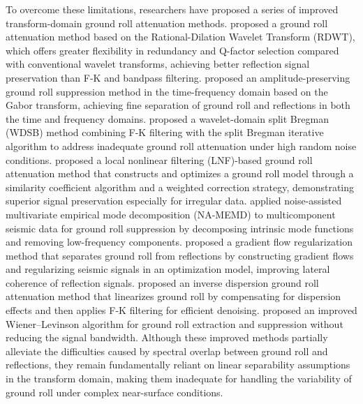 \documentclass[a4paper,fleqn]{cas-dc}
\begin{document}
To overcome these limitations, researchers have proposed a series of improved transform-domain 
ground roll attenuation methods. \citet{mehr2013innovative} proposed a ground roll attenuation 
method based on the Rational-Dilation Wavelet Transform (RDWT), which offers greater 
flexibility in redundancy and Q-factor selection compared with conventional wavelet transforms, 
achieving better reflection signal preservation than F-K and bandpass filtering. 
\citet{wu2024amplitude} proposed an amplitude-preserving ground roll suppression method in 
the time-frequency domain based on the Gabor transform, achieving fine separation of ground 
roll and reflections in both the time and frequency domains. \citet{iranimehr2021seismic} 
proposed a wavelet-domain split Bregman (WDSB) method combining F-K filtering with the split 
Bregman iterative algorithm to address inadequate ground roll attenuation under high random 
noise conditions. \citet{yuan2022adaptive} proposed a local nonlinear filtering (LNF)-based 
ground roll attenuation method that constructs and optimizes a ground roll model through a 
similarity coefficient algorithm and a weighted correction strategy, demonstrating superior 
signal preservation especially for irregular data. \citet{xiao2022ground} applied 
noise-assisted multivariate empirical mode decomposition (NA-MEMD) to multicomponent seismic 
data for ground roll suppression by decomposing intrinsic mode functions and removing 
low-frequency components. \citet{cai2018ground} proposed a gradient flow regularization 
method that separates ground roll from reflections by constructing gradient flows and 
regularizing seismic signals in an optimization model, improving lateral coherence of 
reflection signals. \citet{jin2024improvement} proposed an inverse dispersion ground roll 
attenuation method that linearizes ground roll by compensating for dispersion effects and 
then applies F-K filtering for efficient denoising. \citet{karsli2004using} proposed an 
improved Wiener--Levinson algorithm for ground roll extraction and suppression without 
reducing the signal bandwidth. Although these improved methods partially alleviate the 
difficulties caused by spectral overlap between ground roll and reflections, they remain 
fundamentally reliant on linear separability assumptions in the transform domain, making 
them inadequate for handling the variability of ground roll under complex near-surface 
conditions.
\end{document}
